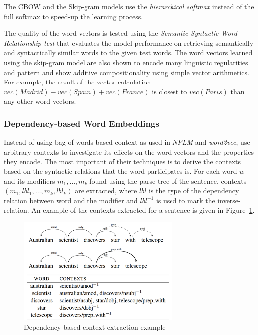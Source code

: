 The CBOW and the Skip-gram models use the \emph{hierarchical softmax} \citep{morin2005hierarchical} instead of the full softmax to speed-up the learning process.

The quality of the word vectors is tested using the \emph{Semantic-Syntactic Word Relationship test} that evaluates the model performance on retrieving semantically and syntactically similar words to the given test words. The word vectors learned using the skip-gram model are also shown to encode many linguistic regularities and pattern \citep{mikolov2013linguistic} and show additive compositionality using simple vector arithmetics. For example, the result of the vector calculation $vec(Madrid) - vec(Spain) + vec(France)$ is closest to $vec(Paris)$ than any other word vectors.

\subsubsection{Dependency-based Word Embeddings}
Instead of using bag-of-words based context as used in \emph{NPLM} and \emph{word2vec}, \cite{levy2014dependencybased} use arbitrary contexts to investigate its effects on the word vectors and the properties they encode. The most important of their techniques is to derive the contexts based on the syntactic relations that the word participates is. For each word $w$ and its modifiers $m_1, \ldots, m_k$ found using the parse tree of the sentence, contexts $(m_{1}, lbl_{1}, \ldots, m_{k}, lbl_{k})$ are extracted, where $lbl$ is the type of the dependency relation between word and the modifier and $lbl^{-1}$ is used to mark the inverse-relation. An example of the contexts extracted for a sentence is given in Figure~\ref{fig:dep:context}.
\begin{figure}[h!]
    \centering
        \includegraphics[width=0.7\textwidth]{figs/dependency_context.png}
    \caption{Dependency-based context extraction example }
    \label{fig:dep:context}
\end{figure}
